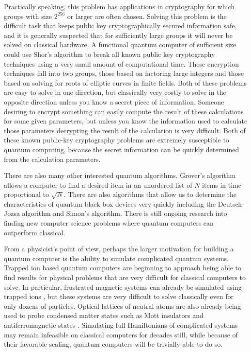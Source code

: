 Practically speaking, this problem has applications in cryptography for which groups with size $2^{256}$ or larger are often chosen. Solving this problem is the difficult task that keeps public key cryptographically secured information safe, and it is generally suspected that for sufficiently large groups it will never be solved on classical hardware.  A functional quantum computer of sufficient size could use Shor's algorithm to break all known public key cryptography techniques using a very small amount of computational time. These encryption techniques fall into two groups, those based on factoring large integers and those based on solving for roots of elliptic curves in finite fields.  Both of these problems are easy to solve in one direction, but classically very costly to solve in the opposite direction unless you know a secret piece of information.  Someone desiring to encrypt something can easily compute the result of these calculations for some given parameters, but unless you know the information used to calculate those parameters decrypting the result of the calculation is very difficult.  Both of these known public-key cryptography problems are extremely susceptible to quantum computing, because the secret information can be quickly determined from the calculation parameters.

There are also many other interested quantum algorithms.  Grover's algorithm allows a computer to find a desired item in an unordered list of $N$ items in time proportional to $\sqrt{N}$.  There are also algorithms that allow us to determine the characteristics of quantum black box devices very quickly including the Deutsch-Jozsa algorithm and Simon's algorithm.  There is still ongoing research into finding new computer science problems where quantum computers can outperform classical.

From a physicist's point of view, perhaps the larger motivation for building a quantum computer is the ability to simulate complicated quantum systems.  Trapped ion based quantum computers are beginning to approach being able to find results for physical problems that are very difficult for classical computers to solve.  In particular, frustrated magnetic systems can already be simulated using trapped ions \cite{Islam:13}, but these systems are very difficult to solve classically even for only dozens of particles.  Optical lattices of neutral atoms are also already being used to probe condensed matter states such as Mott insulators and antiferromagnetic states \cite{Bakr:09}.  Simulating full Hamiltonians of complicated systems may remain infeasible on classical computers for decades still, while because of their favorable scaling, quantum computers will be trivially able to do so.

